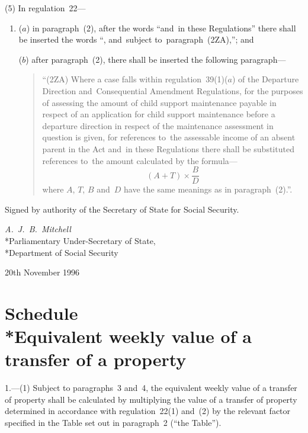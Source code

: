 \documentclass[12pt,a4paper]{article}
\begin{document}
(5) In regulation~22—
\begin{enumerate}\item[]
($a$) in paragraph~(2), after the words “and~in these Regulations” there shall be
inserted the words “, and~subject to~paragraph~(2ZA),”; and

($b$) after paragraph~(2), there shall be inserted the following paragraph—
\begin{quotation}
“(2ZA) Where a case falls within regulation~39(1)($a$) of the Departure Direction
and~Consequential Amendment Regulations, for the purposes of assessing the
amount of child support maintenance payable in respect of an application for
child support maintenance before a departure direction in respect of the
maintenance assessment in question is given, for references to~the assessable
income of an absent parent in the Act and~in these Regulations there shall be
substituted references to~the amount calculated by the formula—
\[(A + T) \times \frac{B}{D}\]
where $A$, $T$, $B$ and~$D$ have the same meanings as in paragraph~(2).”.
\end{quotation}
\end{enumerate}


\bigskip

Signed by authority of the Secretary of State for Social Security.

{\raggedleft
\emph{A.~J.~B.~Mitchell}\\*Parliamentary Under-Secretary of
State,\\*Department of Social Security

}

20th November 1996

\small

\vfill

\part[Schedule~--- Equivalent weekly value of a transfer of a property]{Schedule\\*Equivalent weekly value of a transfer of a property}

\renewcommand\parthead{--- Schedule}

1.—(1) Subject to
paragraphs~3 and~4, the equivalent weekly value of a transfer of property shall
be calculated by multiplying the value of a transfer of property determined in
accordance with regulation~22(1) and~(2) by the relevant factor specified in the
Table set out in paragraph~2 (“the Table”).
\end{document}
